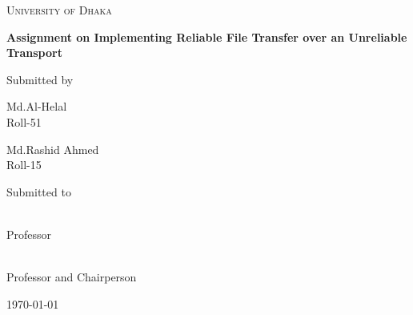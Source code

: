 \documentclass[12pt,a4paper]{report}
\begin{document}
\begin{titlepage}
\centering
{\scshape\LARGE University of Dhaka \par}
\vspace{1.5cm}
{\huge\bfseries Assignment on Implementing Reliable File Transfer over an Unreliable Transport\par}
\vspace{3cm}
Submitted by\\
\vspace{0.5cm}
{\Large \parbox{5cm}{\centering Md.Al-Helal\\Roll-51}\hspace{1cm}\parbox{6cm}{\centering Md.Rashid Ahmed\\Roll-15}}
\vfill
Submitted to\\
\vspace{0.8cm}
\parbox{9cm}{ \\ Professor}\hspace{1cm}\parbox{5cm}{ \\Professor and Chairperson}
\vfill
{\large \today\par}
\end{titlepage}
\end{document}
